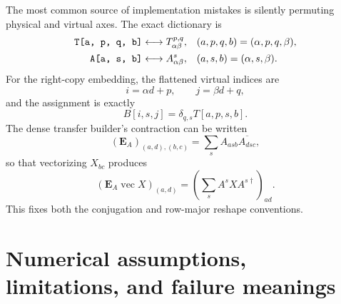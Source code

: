 \documentclass[11pt]{article}
\newcommand{\vecop}{\operatorname{vec}}
\newcommand{\code}[1]{\texttt{\detokenize{#1}}}
\begin{document}
The most common source of implementation mistakes is silently permuting
physical and virtual axes.  The exact dictionary is
\begin{align}
  \code{T[a, p, q, b]}
  &\longleftrightarrow T^{p,q}_{\alpha\beta},
  &&(a,p,q,b)=(\alpha,p,q,\beta),
  \label{eq:axis-map-T}\\
  \code{A[a, s, b]}
  &\longleftrightarrow A^s_{\alpha\beta},
  &&(a,s,b)=(\alpha,s,\beta).
  \label{eq:axis-map-A}
\end{align}
For the right-copy embedding, the flattened virtual indices are
\begin{equation}
  i=\alpha d+p,
  \qquad
  j=\beta d+q,
  \label{eq:flattened-copy-index}
\end{equation}
and the assignment is exactly
\begin{equation}
  B[i,s,j]
  =
  \delta_{q,s}T[a,p,s,b].
  \label{eq:array-right-copy}
\end{equation}
The dense transfer builder's contraction can be written
\begin{equation}
  (\mathbf E_A)_{(a,d),(b,c)}
  =
  \sum_s A_{a s b}\overline{A_{d s c}},
  \label{eq:dense-transfer-indices}
\end{equation}
so that vectorizing $X_{bc}$ produces
\begin{equation}
  (\mathbf E_A\vecop X)_{(a,d)}
  =
  \left(\sum_sA^sX A^{s\dagger}\right)_{ad}.
  \label{eq:dense-transfer-vectorization}
\end{equation}
This fixes both the conjugation and row-major reshape conventions.

\section{Numerical assumptions, limitations, and failure meanings}
\label{sec:limitations}
\end{document}
